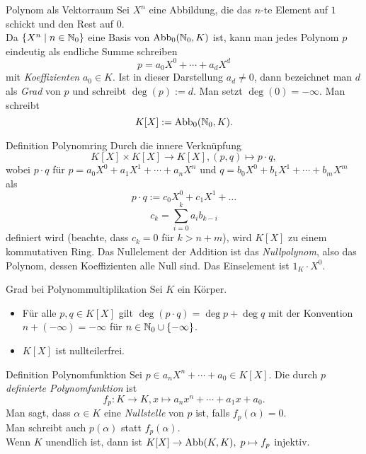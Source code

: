 \documentclass[main.tex]{subfiles}
\begin{document}
\begin{karte}{Polynom als Vektorraum}
    Sei \( X^n \) eine Abbildung, die das \(n\)-te Element auf 
    \(1\) schickt und den Rest auf \(0\).\\
    Da \( \{X^n \;\vert \; n\in \mathbb{N}_0\} \) eine Basis von 
    \( \operatorname{Abb}_0(\mathbb{N}_0, K) \) ist, kann man jedes 
    Polynom \(p\) eindeutig als endliche Summe schreiben 
    \[ p = a_0 X^0 + \cdots + a_d X^d \] 
    mit \textit{Koeffizienten} \( a_0 \in K \). Ist in dieser 
    Darstellung \( a_d \neq 0 \), dann bezeichnet man \(d\) als 
    \textit{Grad} von \(p\) und schreibt \( \deg(p) := d \). Man 
    setzt \( \deg(0) = -\infty \). Man schreibt 
    \[ K[X] := \operatorname{Abb}_0(\mathbb{N}_0, K). \]
\end{karte}
\begin{karte}{Definition Polynomring}
    Durch die innere Verknüpfung 
    \[ K[X] \times K[X] \rightarrow K[X], 
    (p,q) \mapsto p \cdot q, \]
    wobei \( p \cdot q \) für \( p = a_0 X^0 + a_1 X^1 
    + \cdots + a_n X^n \) und \( q = b_0 X^0 + b_1 X^1 
    + \cdots + b_m X^m \) als 
    \[ p \cdot q := c_0 X^0 + c_1 X^1 + \ldots \]
    \[ c_k = \sum_{i=0}^k a_i b_{k-i} \]
    definiert wird (beachte, dass \(c_k = 0\) für 
    \( k > n + m \)), wird \( K[X] \) zu einem kommutativen Ring. 
    Das Nullelement der Addition ist das \textit{Nullpolynom}, 
    also das Polynom, dessen Koeffizienten alle Null sind. 
    Das Einselement ist \( 1_K \cdot X^0 \).
\end{karte}
\begin{karte}{Grad bei Polynommultiplikation}
    Sei \(K\) ein Körper. 
    \begin{itemize}
        \item Für alle \( p,q \in K[X] \) gilt 
        \( \deg(p \cdot q) = \deg p + \deg q \) mit der 
        Konvention \( n + (-\infty) = -\infty \) für 
        \( n \in \mathbb{N}_0 \cup \{-\infty\} \).
        \item \( K[X] \) ist nullteilerfrei.
    \end{itemize}
\end{karte}
\begin{karte}{Definition Polynomfunktion}
    Sei \( p \in a_n X^n + \cdots + a_0 \in K[X] \). Die 
    durch \(p\) \textit{definierte Polynomfunktion} ist 
    \[ f_p : K \rightarrow K, x \mapsto a_n x^n + \cdots 
    + a_1 x + a_0. \]
    Man sagt, dass \( \alpha \in K \) eine \textit{Nullstelle} 
    von \(p\) ist, falls \( f_p(\alpha) = 0 \). \\
    Man schreibt auch \( p(\alpha) \) statt \(f_p(\alpha)\).\\
    Wenn \(K\) unendlich ist, dann ist 
    \( K[X] \rightarrow \operatorname{Abb}(K,K), \; p \mapsto f_p \) injektiv.
\end{karte}
\end{document}
